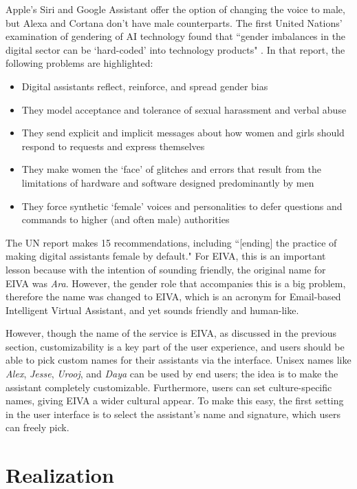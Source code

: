 \documentclass{article}
\begin{document}
Apple's Siri and Google Assistant offer the option of changing the voice to male, but Alexa and Cortana don't have male counterparts. The first United Nations' examination of gendering of AI technology found that ``gender imbalances in the digital sector can be `hard-coded' into technology products" \cite{noauthor_id_nodate}. In that report, the following problems are highlighted:

\begin{itemize}
	\item Digital assistants reflect, reinforce, and spread gender bias
	\item They model acceptance and tolerance of sexual harassment and verbal abuse
	\item They send explicit and implicit messages about how women and girls should respond to requests and express themselves
	\item They make women the ‘face’ of glitches and errors that result from the limitations of hardware and software designed predominantly by men
	\item They force synthetic ‘female’ voices and personalities to defer questions and commands to higher (and often male) authorities
\end{itemize}

The UN report makes 15 recommendations, including ``[ending] the practice of making digital assistants female by default." For EIVA, this is an important lesson because with the intention of sounding friendly, the original name for EIVA was \emph{Ara}. However, the gender role that accompanies this is a big problem, therefore the name was changed to EIVA, which is an acronym for Email-based Intelligent Virtual Assistant, and yet sounds friendly and human-like.

However, though the name of the service is EIVA, as discussed in the previous section, customizability is a key part of the user experience, and users should be able to pick custom names for their assistants via the interface. Unisex names like \emph{Alex}, \emph{Jesse}, \emph{Urooj}, and \emph{Daya} can be used by end users; the idea is to make the assistant completely customizable. Furthermore, users can set culture-specific names, giving EIVA a wider cultural appear. To make this easy, the first setting in the user interface is to select the assistant's name and signature, which users can freely pick.

\newpage

\section{Realization}
\end{document}

